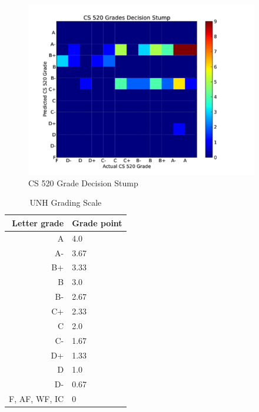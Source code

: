\documentclass[letterpaper,11pt]{article}
\begin{document}
\begin{figure}[h!]
\includegraphics[width=4in]{520grade_des.pdf}
  \caption {CS 520 Grade Decision Stump}
\label{figure:heatmaps6}
\end{figure}

\begin{table}[h!]
\begin{center}
  \begin{tabular}{ r | l }
      Letter grade & Grade point \\ \hline
    A & 4.0 \\
    A- & 3.67 \\ 
    B+ & 3.33  \\ 
    B & 3.0  \\
    B- & 2.67  \\
    C+ & 2.33  \\ 
    C & 2.0  \\ 
    C- & 1.67  \\ 
    D+ & 1.33  \\ 
    D & 1.0  \\ 
    D- & 0.67  \\ 
    F, AF, WF, IC & 0 \\
      \end{tabular}
    \end{center}
  \caption {UNH Grading Scale}
\label{table:unhscale}
\end{table}
\end{document}
